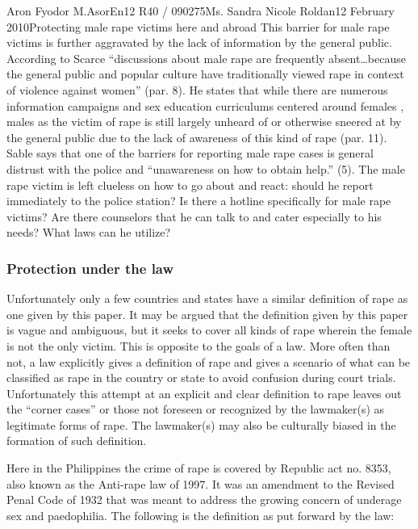 \documentclass[12pt,letterpaper]{article}
\begin{document}
\begin{mla}{Aron Fyodor M.}{Asor}{En12 R40 / 090275}{Ms. Sandra Nicole Roldan}{12 February 2010}{Protecting male rape victims here and abroad}
This barrier for male rape victims is further aggravated by the lack of information by the general public. According to Scarce ``discussions about male rape are frequently absent\ldots because the general public and popular culture have traditionally viewed rape in context of violence against women'' (par. 8). He states that while there are numerous information campaigns and sex education curriculums centered around females , males as the victim of rape is still largely unheard of or otherwise sneered at by the general public due to the lack of awareness of this kind of rape (par. 11). Sable says that one of the barriers for reporting male rape cases is general distrust with the police and ``unawareness on how to obtain help.'' (5). The male rape victim is left clueless on how to go about and react: should he report immediately to the police station? Is there a hotline specifically for male rape victims? Are there counselors that he can talk to and cater especially to his needs? What laws can he utilize?

\subsubsection{Protection under the law}
%
%
\tab Unfortunately only a few countries and states have a similar definition of rape as one given by this paper. It may be argued that the definition given by this paper is vague and ambiguous, but it seeks to cover all kinds of rape wherein the female is not the only victim. This is opposite to the goals of a law. More often than not, a law explicitly gives a definition of rape and gives a scenario of what can be classified as rape in the country or state to avoid confusion during court trials. Unfortunately this attempt at an explicit and clear definition to rape leaves out the ``corner cases'' or those not foreseen or recognized by the lawmaker(s) as legitimate forms of rape. The lawmaker(s) may also be culturally biased in the formation of such definition. 

Here in the Philippines the crime of rape is covered by Republic act no. 8353, also known as the Anti-rape law of 1997. It was an amendment to the Revised Penal Code of 1932 that was meant to address the growing concern of underage sex and paedophilia. The following is the definition as put forward by the law:


\end{mla}
\end{document}

